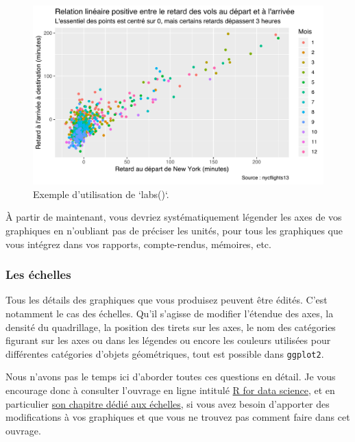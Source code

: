 \documentclass[
  a4paper,
]{article}
\begin{document}
\begin{figure}[htpb]

{\centering \includegraphics[width=0.9\linewidth]{figure/varcolorlabel2-1} 

}

\caption{Exemple d'utilisation de `labs()`.}\label{fig:varcolorlabel2}
\end{figure}

À partir de maintenant, vous devriez systématiquement légender les axes de vos graphiques en n'oubliant pas de préciser les unités, pour tous les graphiques que vous intégrez dans vos rapports, compte-rendus, mémoires, etc.

\hypertarget{les-uxe9chelles}{%
\subsubsection{Les échelles}\label{les-uxe9chelles}}

Tous les détails des graphiques que vous produisez peuvent être édités. C'est notamment le cas des échelles. Qu'il s'agisse de modifier l'étendue des axes, la densité du quadrillage, la position des tirets sur les axes, le nom des catégories figurant sur les axes ou dans les légendes ou encore les couleurs utilisées pour différentes catégories d'objets géométriques, tout est possible dans \texttt{ggplot2}.

Nous n'avons pas le temps ici d'aborder toutes ces questions en détail. Je vous encourage donc à consulter l'ouvrage en ligne intitulé \href{http://r4ds.had.co.nz/}{R for data science}, et en particulier \href{http://r4ds.had.co.nz/graphics-for-communication.html\#scales}{son chapitre dédié aux échelles}, si vous avez besoin d'apporter des modifications à vos graphiques et que vous ne trouvez pas comment faire dans cet ouvrage.
\end{document}
